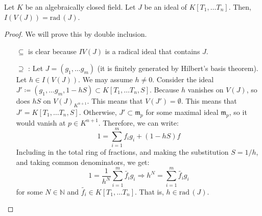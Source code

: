 \begin{theorem}
    Let $K$ be an algebraically closed field.
    Let $J$ be an ideal of $K[T_1, \ldots T_n]$.
    Then, $I(V(J)) = \text{rad}\,(J)$.

    \begin{proof}
        We will prove this by double inclusion.

        \begin{itemize}
            \item [$\subseteq$] is clear because $IV(J)$ is a radical ideal that contains $J$.
            \item[$\supseteq$]: Let $J = (g_1, \ldots g_m)$ (it is finitely generated by Hilbert's basis theorem). \linebreak
            Let $h \in I(V(J))$.
            We may assume $h \neq 0$.
            Consider the ideal $J' \coloneqq (g_1, \ldots g_m, 1 - hS) \subset K[T_1, \ldots T_{n}, S]$.
            Because $h$ vanishes on $V(J)$, so does $hS$ on $V(J)_{K^{n+1}}$.
            This means that $V(J') = \emptyset$.
            This means that $J' = K[T_1, \ldots T_{n}, S]$.
            Otherwise, $J' \subset \mathfrak{m}_p$ for some maximal ideal $\mathfrak{m}_p$,
            so it would vanish at $p \in K^{n+1}$.
            Therefore, we can write:
            \[
                1 = \sum_{i=1}^m f_i g_i + (1 - hS)f
            \]
            Including in the total ring of fractions, and making the substitution $S = 1/h$,
            and taking common denominators, we get:
            \[
                1 = \frac{1}{h^N} \sum_{i=1}^m \tilde{f_i} g_i \Rightarrow h^N = \sum_{i=1}^m \tilde{f_i} g_i
            \]
            for some $N \in \mathbb{N}$ and $\tilde{f_i} \in K[T_1, \ldots T_n]$.
            That is, $h \in \text{rad}\,(J)$.

        \end{itemize}
    \end{proof}

\end{theorem}


